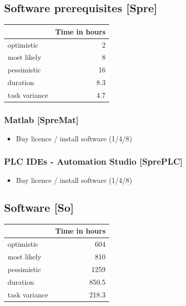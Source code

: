 \subsection*{Software prerequisites [Spre]}
\label{sec:org180caa5}

\begin{center}
\begin{tabular}{|l|r|}
	\hline
	& Time in hours\\
	\hline
	optimistic & 2\\
	\hline
	most likely & 8\\
	\hline
	pessimistic & 16\\
	\hline
	\hline
	duration & 8.3\\
	\hline
	task variance & 4.7\\
	\hline
\end{tabular}
\end{center}

\subsubsection*{Matlab [SpreMat]}
\label{sec:orgda25cf6}
\begin{itemize}
\item Buy licence / install software  (1/4/8)
\end{itemize}

\subsubsection*{PLC IDEs - Automation Studio [SprePLC]}
\label{sec:org003d4a8}
\begin{itemize}
\item Buy licence / install software (1/4/8)
\end{itemize}

\subsection*{Software [So]}
\label{sec:orgdf36b5c}

\begin{center}
\begin{tabular}{|l|r|}
	\hline
	& Time in hours\\
	\hline
	optimistic & 604\\
	\hline
	most likely & 810\\
	\hline
	pessimistic & 1259\\
	\hline
	\hline
	duration & 850.5\\
	\hline
	task variance & 218.3\\
	\hline
\end{tabular}
\end{center}
